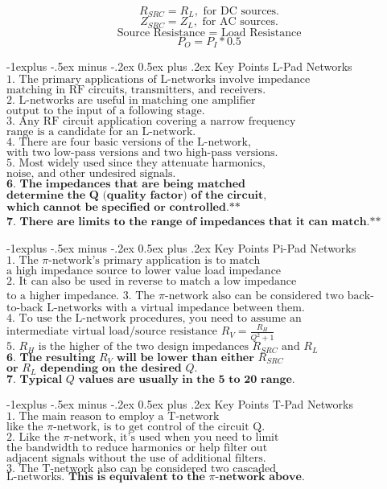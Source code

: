\documentclass[10pt,landscape]{article}
\makeatletter
\renewcommand{\subsection}{\@startsection{subsection}{2}{0mm}%
                                {-1explus -.5ex minus -.2ex}%
                                {0.5ex plus .2ex}%
                                {\normalfont\normalsize\bfseries}}
\makeatother
\begin{document}
\begin{multicols}{3}
$$R_{SRC} = R_L, \text{ for DC sources.}$$
$$Z_{SRC} = Z_L, \text{ for AC sources.}$$
$$\text{Source Resistance = Load Resistance}$$
$$P_O = P_I * 0.5$$  

\subsection{Key Points L-Pad Networks}  
$\text{1. The primary applications of L-networks involve impedance}$
$\text{matching in RF circuits, transmitters, and receivers.}$  
$\text{2. L-networks are useful in matching one amplifier}$
$\text{output to the input of a following stage.}$  
$\text{3. Any RF circuit application covering a narrow frequency}$  
$\text{range is a candidate for an L-network.}$  
$\text{4. There are four basic versions of the L-network,}$
$\text{with two low-pass versions and two high-pass versions.}$
$\text{5. Most widely used since they attenuate harmonics,}$
$\text{noise, and other undesired signals.}$
$\textbf{6. The impedances that are being matched}$
$\textbf{determine the Q (quality factor) of the circuit,}$
$\textbf{which cannot be specified or controlled.**}$
$\textbf{7. There are limits to the range of impedances}$
$\textbf{that it can match.**}$

\subsection{Key Points Pi-Pad Networks}  
$\text{1. The }\pi\text{-network’s primary application is to match}$
$\text{a high impedance source to lower value load impedance}$  
$\text{2. It can also be used in reverse to match a low impedance}$
$\text{to a higher impedance.}$  
$\text{3. The }\pi\text{-network also can be considered two back-}$  
$\text{to-back L-networks with a virtual impedance between them.}$  
$\text{4. To use the L-network procedures, you need to assume an}$
$\text{intermediate virtual load/source resistance } R_V = \frac{R_H}{Q^2 + 1}$
$\text{5. $R_H$ is the higher of the two design impedances } R_{SRC} \text{ and } R_L$
$\textbf{6. The resulting } R_V \textbf{ will be lower than either } R_{SRC}$
$\textbf{or } R_L \textbf{ depending on the desired } Q.$
$\textbf{7. Typical }Q \textbf{ values are usually in the 5 to 20 range.}$

\subsection{Key Points T-Pad Networks}  
$\text{1. The main reason to employ a T-network}$
$\text{like the }\pi \text{-network, is to get control of the circuit Q.}$  
$\text{2. Like the }\pi \text{-network, it's used when you need to limit}$
$\text{the bandwidth to reduce harmonics or help filter out}$
$\text{adjacent signals without the use of additional filters.}$   
$\text{3. The T-network also can be considered two cascaded}$  
$\text{L-networks. }\textbf{This is equivalent to the }\pi\textbf{-network above.}$  


\end{multicols}
\end{document}

